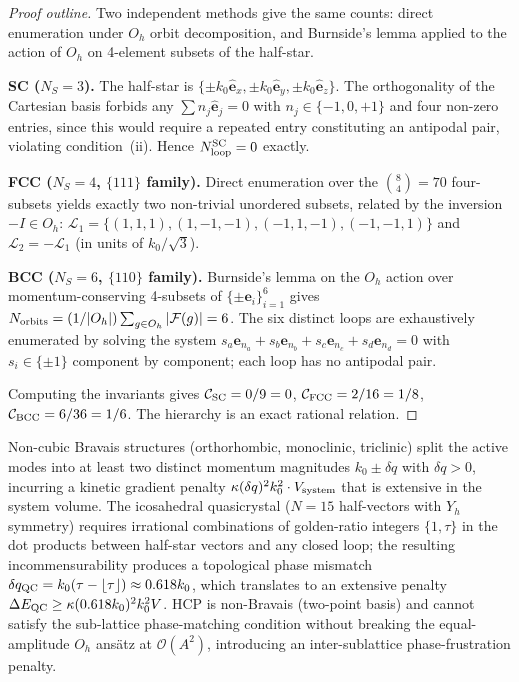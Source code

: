\begin{proof}[Proof outline]
Two independent methods give the same counts: direct enumeration
under $O_h$ orbit decomposition, and Burnside's lemma applied to the
action of $O_h$ on 4-element subsets of the half-star.

\textbf{SC ($N_S = 3$).} The half-star is $\{\pm k_0
\hat{\mathbf{e}}_x, \pm k_0 \hat{\mathbf{e}}_y, \pm k_0
\hat{\mathbf{e}}_z\}$. The orthogonality of the Cartesian basis
forbids any $\sum n_j \hat{\mathbf{e}}_j = 0$ with $n_j \in
\{-1,0,+1\}$ and four non-zero entries, since this would require a
repeated entry constituting an antipodal pair, violating
condition~(ii). Hence $N_{\rm loop}^{\rm SC} = 0$ exactly.

\textbf{FCC ($N_S = 4$, $\{111\}$ family).} Direct enumeration over
the $\binom{8}{4} = 70$ four-subsets yields exactly two non-trivial
unordered subsets, related by the inversion $-I \in O_h$:
$\mathcal{L}_1 = \{(1,1,1),(1,-1,-1),(-1,1,-1),(-1,-1,1)\}$ and
$\mathcal{L}_2 = -\mathcal{L}_1$ (in units of $k_0/\sqrt{3}$).

\textbf{BCC ($N_S = 6$, $\{110\}$ family).} Burnside's lemma on the
$O_h$ action over momentum-conserving 4-subsets of $\{\pm
\mathbf{e}_i\}_{i=1}^6$ gives $N_{\rm orbits} = (1/|O_h|)
\sum_{g \in O_h} |\mathcal{F}(g)| = 6$. The six distinct loops are
exhaustively enumerated by solving the system $s_a \mathbf{e}_{n_a} +
s_b \mathbf{e}_{n_b} + s_c \mathbf{e}_{n_c} + s_d \mathbf{e}_{n_d} = 0$
with $s_i \in \{\pm 1\}$ component by component; each loop has no
antipodal pair.

Computing the invariants gives $\mathcal{C}_{\rm SC} = 0/9 = 0$,
$\mathcal{C}_{\rm FCC} = 2/16 = 1/8$, $\mathcal{C}_{\rm BCC} = 6/36 = 1/6$.
The hierarchy is an exact rational relation.
\end{proof}

\begin{remark}
\label{rem:exclusion}
Non-cubic Bravais structures (orthorhombic, monoclinic, triclinic)
split the active modes into at least two distinct momentum magnitudes
$k_0 \pm \delta q$ with $\delta q > 0$, incurring a kinetic gradient
penalty $\kappa(\delta q)^2 k_0^2 \cdot V_{\rm system}$ that is
extensive in the system volume. The icosahedral quasicrystal
($N = 15$ half-vectors with $Y_h$ symmetry) requires irrational
combinations of golden-ratio integers $\{1,\tau\}$ in the dot products
between half-star vectors and any closed loop; the resulting
incommensurability produces a topological phase mismatch
$\delta q_{\rm QC} = k_0 (\tau - \lfloor \tau \rfloor) \approx 0.618
k_0$, which translates to an extensive penalty $\Delta E_{\rm QC}
\geq \kappa (0.618 k_0)^2 k_0^2 V$. HCP is non-Bravais (two-point
basis) and cannot satisfy the sub-lattice phase-matching condition
without breaking the equal-amplitude $O_h$ ans\"atz at
$\mathcal{O}(A^2)$, introducing an inter-sublattice phase-frustration
penalty.
\end{remark}

